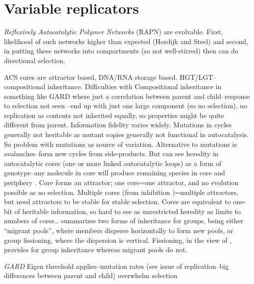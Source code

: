 \section{Variable replicators}
\begin{NOTES}

\emph{Reflexively Autocatalytic Polymer Networks} (RAPN) \parencite{Kauffman1986} are evolvable. First, likelihood of such networks higher than expected (Hordijk and Steel) and second, in \cite{Vasas2012} putting these networks into compartments (so not well-stirred) then can do directional selection.

\cite{Vasas2012a} ACS cores are attractor based, DNA/RNA storage based. HGT/LGT--compositional inheritance.
Difficulties with Compositional inheritance in something like GARD where just a correlation between parent and child--response to selection not seen \parencite{Vasas2015}--end up with just one large component (so no selection), no replication as contents not inherited equally, so properties might be quite different from parent. Information fidelity varies widely. Mutations in cycles \parencite{Vasas2012a} generally not heritable as mutant copies generally not functional in autocatalysis. So problem with mutations as source of variation. Alternative to mutations is avalanches--form new cycles from side-products.
But can see heredity in autocatalytic cores (one or more linked autocatalytic loops) as a form of genotype--any molecule in core will produce remaining species in core and periphery \parencite{Vasas2012a}. Core forms an attractor; one core=one attractor, and no evolution possible as no selection. Multiple cores (from inhibition \cite{Vasas2012a})=multiple attractors, but need attractors to be stable for stable selection. Cores are equivalent to one-bit of heritable information, so hard to see as unrestricted heredity as limits to numbers of cores…
\cite{Watson2015} summarizes two forms of inheritance for groups, being either ``migrant pools'', where members disperse horizontally to form new pools, or group fissioning, where the dispersion is vertical. Fissioning, in the view of \cite{Watson2015}, provides for group inheritance whereas migrant pools do not.

			

\emph{GARD} \parencite{Segre1998}
Eigen threshold applies--mutation rates (see issue of replication--big differences between parent and child) overwhelm selection \parencite{Vasas2015, Vasas2012, Vasas2012a}


\end{NOTES}
